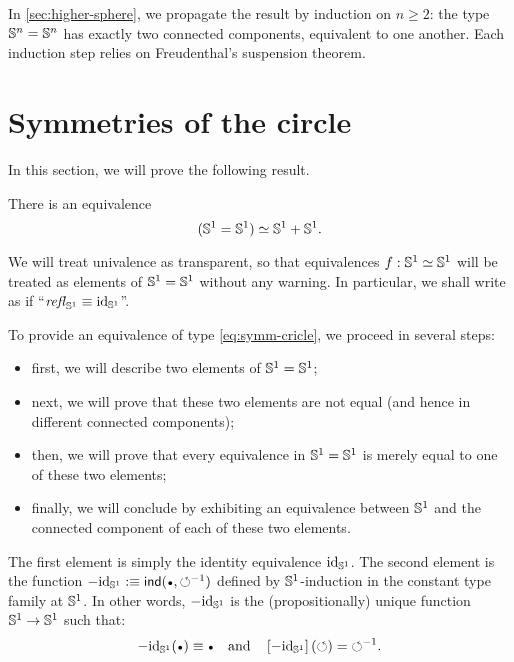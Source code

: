 \documentclass[english,a4]{article}
\renewcommand{\ap}[1]{\left[{#1}\right]}
\begin{document}
In \cref{sec:higher-sphere}, we propagate the result by induction on
$n\geq 2$: the type ${\mathbb S^{n}} = {\mathbb S^{n}}$ has exactly two connected
components, equivalent to one another. Each induction step relies on
Freudenthal's suspension theorem.

\section{Symmetries of the circle}
\label{sec:circle-case}%

In this section, we will prove the following result.
\begin{theorem}
  There is an equivalence
  \begin{equation}
    \label{eq:symm-cricle}%
    (\Sc = \Sc) \weq \Sc+\Sc.
  \end{equation}
  \label{thm:symmetries-of-S1}
\end{theorem}
We will treat univalence as transparent, so that equivalences
$f:{{\mathbb S^{1}}}\simeq {{\mathbb S^{1}}}$ will be treated as elements of ${{\mathbb S^{1}}}={{\mathbb S^{1}}}$ without any
warning. In particular, we shall write as if
``$\mathop{{\mathit{refl}}_{{{\mathbb S^{1}}}}} \equiv \mathord{\mathrm{id}}_{{\mathbb S^{1}}}$''.

To provide an equivalence of type \cref{eq:symm-cricle}, we proceed
in several steps:
\begin{itemize}
\item first, we will describe two elements of ${{\mathbb S^{1}}}={{\mathbb S^{1}}}$;
\item next, we will prove that these two elements are not equal (and
hence in different connected components);
\item then, we will prove that every equivalence in ${{\mathbb S^{1}}}={{\mathbb S^{1}}}$ is
  merely equal to one of these two elements;
\item finally, we will conclude by exhibiting an equivalence between
  ${{\mathbb S^{1}}}$ and the connected component of each of these two elements.
\end{itemize}

The first element is simply the identity equivalence $\mathord{\mathrm{id}}_{{\mathbb S^{1}}}$. The
second element is the function
$-\id_\Sc \defequi \ind(\base,\inv{\Sloop})$ defined by
${{\mathbb S^{1}}}$-induction in the constant type family at ${{\mathbb S^{1}}}$. In other words,
$-\mathord{\mathrm{id}}_{{\mathbb S^{1}}}$ is the (propositionally) unique function ${{\mathbb S^{1}}} \to {{\mathbb S^{1}}}$ such
that:
\begin{displaymath}
  -\id_\Sc(\base) \jdeq \base%
  \quad\text{and}\quad%
  \ap{-\id_\Sc}(\Sloop) = \inv{\Sloop}.
\end{displaymath}
\end{document}
